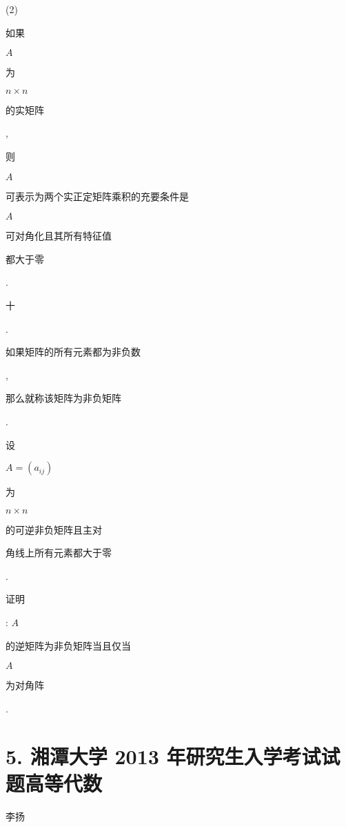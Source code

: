 \documentclass[10pt]{article}
\begin{document}
(2) \begin{CJK}{UTF8}{mj}如果\end{CJK} $A$ \begin{CJK}{UTF8}{mj}为\end{CJK} $n \times n$ \begin{CJK}{UTF8}{mj}的实矩阵\end{CJK}, \begin{CJK}{UTF8}{mj}则\end{CJK} $A$ \begin{CJK}{UTF8}{mj}可表示为两个实正定矩阵乘积的充要条件是\end{CJK} $A$ \begin{CJK}{UTF8}{mj}可对角化且其所有特征值\end{CJK} \begin{CJK}{UTF8}{mj}都大于零\end{CJK}.

\begin{CJK}{UTF8}{mj}十\end{CJK}. \begin{CJK}{UTF8}{mj}如果矩阵的所有元素都为非负数\end{CJK}, \begin{CJK}{UTF8}{mj}那么就称该矩阵为非负矩阵\end{CJK}. \begin{CJK}{UTF8}{mj}设\end{CJK} $A=\left(a_{i j}\right)$ \begin{CJK}{UTF8}{mj}为\end{CJK} $n \times n$ \begin{CJK}{UTF8}{mj}的可逆非负矩阵且主对\end{CJK} \begin{CJK}{UTF8}{mj}角线上所有元素都大于零\end{CJK}. \begin{CJK}{UTF8}{mj}证明\end{CJK}: $A$ \begin{CJK}{UTF8}{mj}的逆矩阵为非负矩阵当且仅当\end{CJK} $A$ \begin{CJK}{UTF8}{mj}为对角阵\end{CJK}.

\section{5. 湘潭大学 2013 年研究生入学考试试题高等代数}
\begin{CJK}{UTF8}{mj}李扬\end{CJK}
\end{document}

